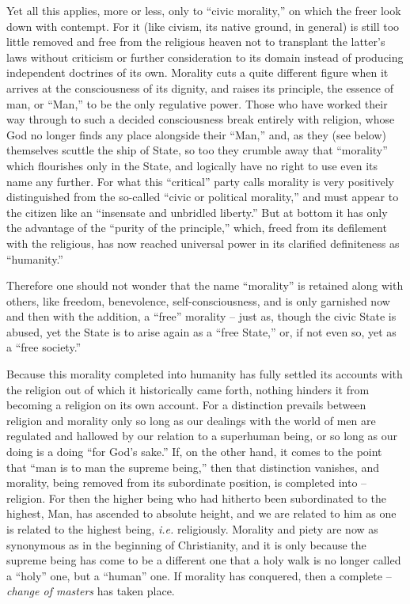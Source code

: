 Yet all this applies, more or less, only to ``civic morality,'' on which the 
freer look down with contempt. For it (like civism, its native ground, in 
general) is still too little removed and free from the religious heaven not to 
transplant the latter's laws without criticism or further consideration to its 
domain instead of producing independent doctrines of its own. Morality cuts a 
quite different figure when it arrives at the consciousness of its dignity, 
and raises its principle, the essence of man, or ``Man,'' to be the only 
regulative power. Those who have worked their way through to such a decided 
consciousness break entirely with religion, whose God no longer finds any 
place alongside their ``Man,'' and, as they (see below) themselves scuttle 
the ship of State, so too they crumble away that ``morality'' which 
flourishes only in the State, and logically have no right to use even its name 
any further. For what this ``critical'' party calls morality is very 
positively distinguished from the so-called ``civic or political morality,'' 
and must appear to the citizen like an ``insensate and unbridled liberty.'' 
But at bottom it has only the advantage of the ``purity of the principle,'' 
which, freed from its defilement with the religious, has now reached universal 
power in its clarified definiteness as ``humanity.''

Therefore one should not wonder that the name ``morality'' is retained along 
with others, like freedom, benevolence, self-consciousness, and is only 
garnished now and then with the addition, a ``free'' morality -- just as, 
though the civic State is abused, yet the State is to arise again as a ``free 
State,'' or, if not even so, yet as a ``free society.''

Because this morality completed into humanity has fully settled its accounts 
with the religion out of which it historically came forth, nothing hinders it 
from becoming a religion on its own account. For a distinction prevails 
between religion and morality only so long as our dealings with the world of 
men are regulated and hallowed by our relation to a superhuman being, or so 
long as our doing is a doing ``for God's sake.'' If, on the other hand, it 
comes to the point that ``man is to man the supreme being,'' then that 
distinction vanishes, and morality, being removed from its subordinate 
position, is completed into -- religion. For then the higher being who had 
hitherto been subordinated to the highest, Man, has ascended to absolute 
height, and we are related to him as one is related to the highest being, 
\textit{i.e.} religiously. Morality and piety are now as synonymous as in the 
beginning of Christianity, and it is only because the supreme being has come 
to be a different one that a holy walk is no longer called a ``holy'' one, 
but a ``human'' one. If morality has conquered, then a complete -- 
\textit{change of masters} has taken place.

